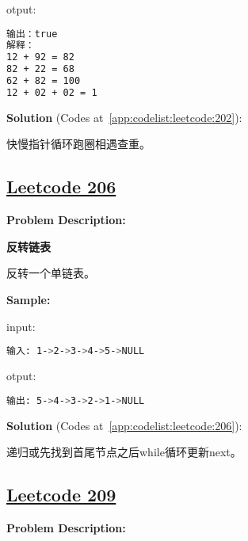 otput:\par

\begin{lstlisting}[language=bash]
输出：true
解释：
12 + 92 = 82
82 + 22 = 68
62 + 82 = 100
12 + 02 + 02 = 1
\end{lstlisting}

\textbf{Solution }(Codes at~\ref{app:codelist:leetcode:202}):\par

快慢指针循环跑圈相遇查重。\par



\subsection{\href{https://leetcode-cn.com/}{Leetcode 206}}\label{app:problemlist:leetcode:206}

\textbf{Problem Description:}\par

\textbf{反转链表}\par

反转一个单链表。\par


\textbf{Sample:}\par

input:\par

\begin{lstlisting}[language=bash]
输入: 1->2->3->4->5->NULL
\end{lstlisting}

otput:\par

\begin{lstlisting}[language=bash]
输出: 5->4->3->2->1->NULL
\end{lstlisting}

\textbf{Solution }(Codes at~\ref{app:codelist:leetcode:206}):\par

递归或先找到首尾节点之后while循环更新next。\par



\subsection{\href{https://leetcode-cn.com/}{Leetcode 209}}\label{app:problemlist:leetcode:209}

\textbf{Problem Description:}\par

